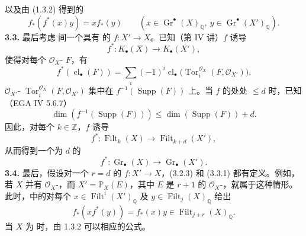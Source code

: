 以及由 (1.3.2) 得到的
\[f_*(f^*(x)y)=x f_*(y)\qquad(x\in\operatorname{Gr}^\bullet(X)_{\mathbb Q},\ y\in\operatorname{Gr}^\bullet(X')_{\mathbb Q}).\]
\textbf{3.3.} 最后考虑  间一个具有 的 $f:X'\longrightarrow X$。已知（第 IV 讲）$f$ 诱导
\[f^*:K_\bullet(X)\longrightarrow K_\bullet(X'),\]
使得对每个 $\mathcal O_X$- $F$，有
\[f^*(\operatorname{cl}_\bullet(F))=\sum_i(-1)^i\operatorname{cl}_\bullet\bigl(\operatorname{Tor}^{\mathcal O_X}_i(F,\mathcal O_{X'})\bigr).\]
$\mathcal O_{X'}$- $\operatorname{Tor}^{\mathcal O_X}_i(F,\mathcal O_{X'})$ 集中在 $f^{-1}(\operatorname{Supp}(F))$ 上。当 $f$ 的处处 $\leq d$ 时，已知（EGA IV 5.6.7）
\[\dim(f^{-1}(\operatorname{Supp}(F)))\leq\dim(\operatorname{Supp}(F))+d.\]
因此，对每个 $k\in\mathbb Z$，$f$ 诱导
\[f^*:\operatorname{Filt}_k(X)\longrightarrow\operatorname{Filt}_{k+d}(X'),\]
从而得到一个为 $d$ 的
\[f^*:\operatorname{Gr}_\bullet(X)\longrightarrow\operatorname{Gr}_\bullet(X').\tag{3.3.1}\]
\textbf{3.4.} 最后，假设对一个 $r=d$ 的 $f:X'\longrightarrow X$，(3.2.3) 和 (3.3.1) 都有定义。例如，若 $X$ 并有 $\mathcal O_X$-，而 $X'=\mathbb P_X(E)$，其中 $E$ 是 $r+1$ 的 $\mathcal O_X$-，就属于这种情形。此时，中的对每个 $x\in\operatorname{Filt}^i(X')_{\mathbb Q}$ 及 $y\in\operatorname{Filt}_j(X)_{\mathbb Q}$ 给出
\[f_*(x f^*(y))=f_*(x)y\in\operatorname{Filt}_{j+r}(X)_{\mathbb Q}.\]
当 $X$ 为  时，由 1.3.2 可以相应的公式。

